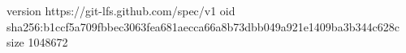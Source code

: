 version https://git-lfs.github.com/spec/v1
oid sha256:b1ccf5a709fbbec3063fea681aecca66a8b73dbb049a921e1409ba3b344c628c
size 1048672
